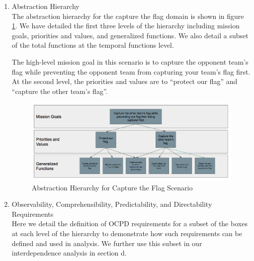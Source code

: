 \documentclass[letterpaper, 10 pt, conference]{ieeeconf}  %
\theoremstyle{definition}
\begin{document}
\begin{enumerate}
\begin{enumerate}
    \item Abstraction Hierarchy
    \\The abstraction hierarchy for the capture the flag domain is shown in figure \ref{fig:ctfah}. We have detailed the first three levels of the hierarchy including mission goals, priorities and values, and generalized functions. We also detail a subset of the total functions at the temporal functions level. %
    
    The high-level mission goal in this scenario is to capture the opponent team's flag while preventing the opponent team from capturing your team's flag first. At the second level, the priorities and values are to ``protect our flag'' and ``capture the other team's flag''.
    
   
    \begin{figure}[tb]
    \centering
    \includegraphics[width=\columnwidth]{ctfAH.png}
   \caption{Abstraction Hierarchy for Capture the Flag Scenario}
    \label{fig:ctfah}
    \end{figure}

    \item Observability, Comprehensibility, Predictability, and Directability Requirements
    \\Here we detail the definition of OCPD requirements for a subset of the boxes at each level of the hierarchy to demonstrate how such requirements can be defined and used in analysis. We further use this subset in our interdependence analysis in section d.
    

\end{enumerate}
\end{enumerate}
\end{document}
